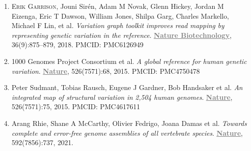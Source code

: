 \documentclass{nihbiosketch}
\newcommand{\hijournal}[1]{{\bf \textcolor{gray}{\uline{#1}}}}
\begin{document}
\begin{statement}



  

\begin{enumerate}[label=\alph*.]

\item \textsc{Erik Garrison}, Jouni Sirén, Adam M Novak, Glenn Hickey, Jordan M Eizenga, Eric T Dawson, William Jones, Shilpa Garg, Charles Markello, Michael F Lin, et al. \emph{Variation graph toolkit improves read mapping by representing genetic variation in the reference}. \hijournal{Nature Biotechnology}, 36(9):875–879, 2018. PMCID: PMC6126949


\item 1000 Genomes Project Consortium et al. \emph{A global reference for human genetic variation}. \hijournal{Nature}, 526(7571):68, 2015. PMCID: PMC4750478

\item Peter Sudmant, Tobias Rausch, Eugene J Gardner, Bob Handsaker et al. \emph{An integrated map of structural variation in 2,504 human genomes}. \hijournal{Nature}, 526(7571):75, 2015. PMCID: PMC4617611

\item Arang Rhie, Shane A McCarthy, Olivier Fedrigo, Joana Damas et al. \emph{Towards complete and error-free genome assemblies of all vertebrate species}. \hijournal{Nature}, 592(7856):737, 2021.

\end{enumerate}

\end{statement}
\end{document}
